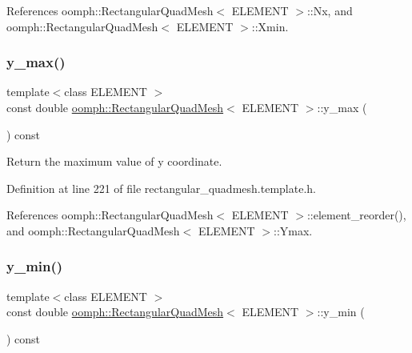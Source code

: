 References oomph\+::\+Rectangular\+Quad\+Mesh$<$ E\+L\+E\+M\+E\+N\+T $>$\+::\+Nx, and oomph\+::\+Rectangular\+Quad\+Mesh$<$ E\+L\+E\+M\+E\+N\+T $>$\+::\+Xmin.

\mbox{\label{classoomph_1_1RectangularQuadMesh_a7d4a00a545efc20451b00a9b8ad1e17d}} 
\subsubsection{\texorpdfstring{y\+\_\+max()}{y\_max()}}
{\footnotesize\ttfamily template$<$class E\+L\+E\+M\+E\+NT $>$ \\
const double \hyperlink{classoomph_1_1RectangularQuadMesh}{oomph\+::\+Rectangular\+Quad\+Mesh}$<$ E\+L\+E\+M\+E\+NT $>$\+::y\+\_\+max (\begin{DoxyParamCaption}{ }\end{DoxyParamCaption}) const\hspace{0.3cm}{\ttfamily [inline]}}



Return the maximum value of y coordinate. 



Definition at line 221 of file rectangular\+\_\+quadmesh.\+template.\+h.



References oomph\+::\+Rectangular\+Quad\+Mesh$<$ E\+L\+E\+M\+E\+N\+T $>$\+::element\+\_\+reorder(), and oomph\+::\+Rectangular\+Quad\+Mesh$<$ E\+L\+E\+M\+E\+N\+T $>$\+::\+Ymax.

\mbox{\label{classoomph_1_1RectangularQuadMesh_a1c493af1dae35746bed7a31e61b46c5b}} 
\subsubsection{\texorpdfstring{y\+\_\+min()}{y\_min()}}
{\footnotesize\ttfamily template$<$class E\+L\+E\+M\+E\+NT $>$ \\
const double \hyperlink{classoomph_1_1RectangularQuadMesh}{oomph\+::\+Rectangular\+Quad\+Mesh}$<$ E\+L\+E\+M\+E\+NT $>$\+::y\+\_\+min (\begin{DoxyParamCaption}{ }\end{DoxyParamCaption}) const\hspace{0.3cm}{\ttfamily [inline]}}



